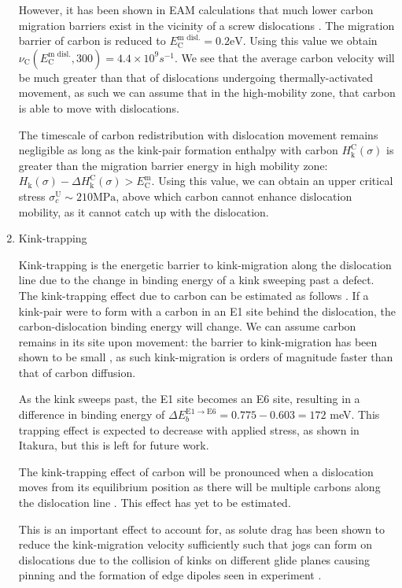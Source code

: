 \documentclass[a4paper,12pt,oneside,print,numbered,index,PageStyleIII]{PhDThesisPSnPDF}
\begin{document}
\begin{enumerate}
However, it has been shown in EAM calculations that much lower carbon migration
barriers exist in the vicinity of a screw dislocations \cite{Nematollahi2016}. The
migration barrier of carbon is reduced to \(E^{\text{m disl.}}_{\text{C}} = 0.2
    \text{eV}\). Using this value we obtain \(\nu_{\text{C}}(E^{\text{m
    disl.}}_{\text{C}}, 300) = 4.4 \times 10^{9} s^{-1}\). We see that the average carbon velocity
will be much greater than that of dislocations undergoing thermally-activated movement, as
such we can assume that in the high-mobility zone, that carbon is able to move with
dislocations.


The timescale of carbon redistribution with dislocation movement remains negligible as
long as the kink-pair formation enthalpy with carbon \(H_{\text{k}}^{\text{C}}(\sigma)\)
is greater than the migration barrier energy in high mobility zone:
\(H_{\text{k}}(\sigma) - \Delta H_{\text{k}}^{\text{C}}(\sigma) >
    E^{\text{m}}_{\text{C}}\). Using this value, we can obtain an upper critical stress
\(\sigma^{\text{U}}_c \sim 210 \text{MPa}\), above which carbon cannot enhance
dislocation mobility, as it cannot catch up with the dislocation.

\item Kink-trapping
\label{sec:orgf73cfa9}

Kink-trapping is the energetic barrier to kink-migration along the dislocation line
due to the change in binding energy of a kink sweeping past a defect. The
kink-trapping effect due to carbon can be estimated as follows
\cite{itakura13_effec_hydrog_atoms_screw_disloc}. If a
kink-pair were to form with a carbon in an E1 site behind the dislocation, the carbon-dislocation binding
energy will change. We can assume carbon remains in its
site upon movement: the barrier to kink-migration has been shown to be small
\cite{itakura13_effec_hydrog_atoms_screw_disloc,Simpson2019,Gong2020}, as such kink-migration is
orders of magnitude faster than that of carbon diffusion.

As the kink sweeps past, the E1 site becomes an E6 site, resulting in a
difference in binding energy of \(\Delta E_b^{\text{E}1\rightarrow
      \text{E}6} = 0.775 - 0.603 = 172\) meV. This trapping effect is expected to
decrease with applied stress, as shown in Itakura, but this is left for
future work.

The kink-trapping effect of carbon will be pronounced when a dislocation
moves from its equilibrium position as there will be multiple carbons along
the dislocation line \cite{Luthi2019}. This effect has yet to be estimated.

This is an important effect to account for, as solute drag has been shown to reduce
the kink-migration velocity sufficiently such that
jogs can form on dislocations due to the collision of kinks on different glide
planes causing pinning and the formation of edge dipoles seen in experiment \cite{Gong2020,Katzarov2017b}.
\end{enumerate}
\end{document}
